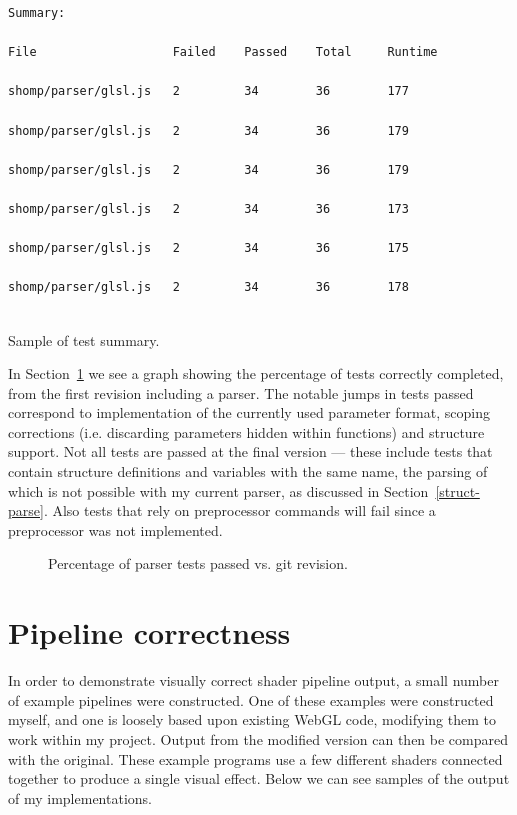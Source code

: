 \documentclass[12pt,twoside,notitlepage]{report}
\begin{document}
\begin{listing}[H]
{\small
\begin{verbatim}
Summary:

File                   Failed    Passed    Total     Runtime

shomp/parser/glsl.js   2         34        36        177

shomp/parser/glsl.js   2         34        36        179

shomp/parser/glsl.js   2         34        36        179

shomp/parser/glsl.js   2         34        36        173

shomp/parser/glsl.js   2         34        36        175

shomp/parser/glsl.js   2         34        36        178


\end{verbatim}
}
\caption{Sample of test summary.\label{summary}}
\end{listing}
In Section~\ref{parser-git} we see a graph showing the percentage of tests correctly completed, from the first revision including a parser. The notable jumps in tests passed correspond to implementation of the currently used parameter format, scoping corrections (i.e. discarding parameters hidden within functions) and structure support. Not all tests are passed at the final version --- these include tests that contain structure definitions and variables with the same name, the parsing of which is not possible with my current parser, as discussed in Section~\ref{struct-parse}. Also tests that rely on preprocessor commands will fail since a preprocessor was not implemented.

\begin{figure}
\centering
{}
\caption{Percentage of parser tests passed vs. git revision.\label{parser-git}}
\end{figure}

\section{Pipeline correctness}
In order to demonstrate visually correct shader pipeline output, a small number of example pipelines were constructed. One of these examples were constructed myself, and one is loosely based upon existing WebGL code\cite{reaction-diffusion}, modifying them to work within my project. Output from the modified version can then be compared with the original. These example programs use a few different shaders connected together to produce a single visual effect. Below we can see samples of the output of my implementations.
\end{document}
